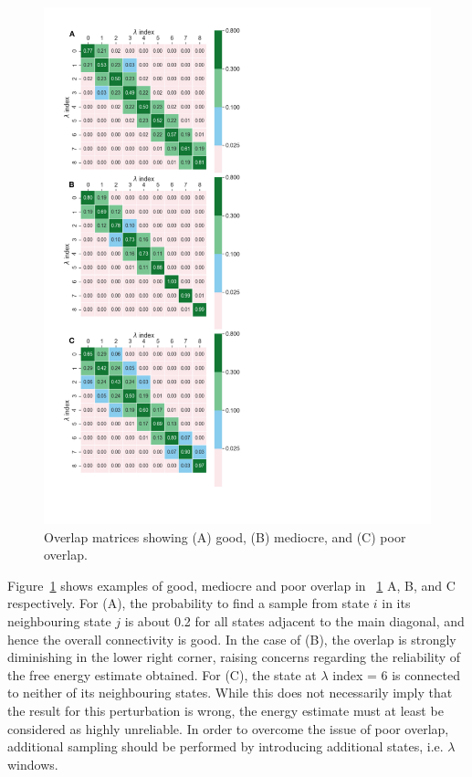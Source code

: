 \documentclass[9pt,bestpractices]{livecoms}
\begin{document}
\begin{figure}
\includegraphics[width=0.95\columnwidth]{paper/figures/fig11_overlap/overlap_matrices.pdf}
\caption{\label{fig:overlap}Overlap matrices showing (A) good, (B) mediocre, and (C) poor overlap.}
\end{figure}
Figure~\ref{fig:overlap} shows examples of good, mediocre and poor overlap in ~\ref{fig:overlap} A, B, and C respectively. For (A), the probability to find a sample from state $i$ in its neighbouring state $j$ is about 0.2 for all states adjacent to the main diagonal, and hence the overall connectivity is good. In the case of (B), the overlap is strongly diminishing in the lower right corner, raising concerns regarding the reliability of the free energy estimate obtained. For (C), the state at $\lambda$ index = 6 is connected to neither of its neighbouring states. While this does not necessarily imply that the result for this perturbation is wrong, the energy estimate must at least be considered as highly unreliable.
In order to overcome the issue of poor overlap, additional sampling should be performed by introducing additional states, i.e. $\lambda$ windows.
\end{document}
